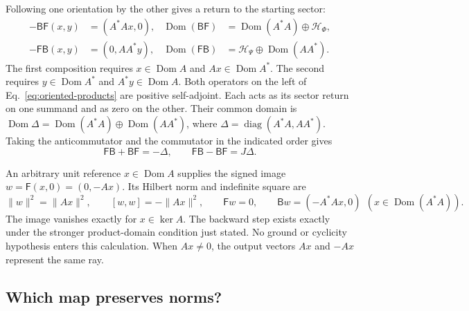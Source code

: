 \documentclass[11pt]{article}
\theoremstyle{definition}
\begin{document}
Following one orientation by the other gives a return to the starting sector:
\begin{equation}
\begin{aligned}
 -\mathsf B\mathsf F(x,y)&=(A^*Ax,0),
 &\operatorname{Dom}(\mathsf B\mathsf F)&=\operatorname{Dom}(A^*A)\oplus\mathcal H_\Phi,\\
 -\mathsf F\mathsf B(x,y)&=(0,AA^*y),
 &\operatorname{Dom}(\mathsf F\mathsf B)&=\mathcal H_\Psi\oplus\operatorname{Dom}(AA^*).
\end{aligned}
 \label{eq:oriented-products}
\end{equation}
The first composition requires $x\in\operatorname{Dom}A$ and $Ax\in\operatorname{Dom}A^*$. The second requires $y\in\operatorname{Dom}A^*$ and $A^*y\in\operatorname{Dom}A$. Both operators on the left of Eq.~\eqref{eq:oriented-products} are positive self-adjoint. Each acts as its sector return on one summand and as zero on the other. Their common domain is $\operatorname{Dom}\Delta=\operatorname{Dom}(A^*A)\oplus\operatorname{Dom}(AA^*)$, where $\Delta=\operatorname{diag}(A^*A,AA^*)$. Taking the anticommutator and the commutator in the indicated order gives
\begin{equation}
 \mathsf F\mathsf B+\mathsf B\mathsf F=-\Delta,\qquad
 \mathsf F\mathsf B-\mathsf B\mathsf F=J\Delta .
 \label{eq:oriented-brackets}
\end{equation}

An arbitrary unit reference $x\in\operatorname{Dom}A$ supplies the signed image $w=\mathsf F(x,0)=(0,-Ax)$. Its Hilbert norm and indefinite square are
\begin{equation}
 \|w\|^2=\|Ax\|^2,\qquad [w,w]=-\|Ax\|^2,\qquad
 \mathsf Fw=0,\qquad \mathsf Bw=(-A^*Ax,0)\ \ (x\in\operatorname{Dom}(A^*A)).
 \label{eq:branch-reference-image}
\end{equation}
The image vanishes exactly for $x\in\ker A$. The backward step exists exactly under the stronger product-domain condition just stated. No ground or cyclicity hypothesis enters this calculation. When $Ax\ne0$, the output vectors $Ax$ and $-Ax$ represent the same ray.

\subsection{Which map preserves norms?}
\end{document}
